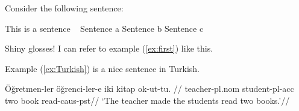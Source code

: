 \documentclass{article}
\title{}
\author{}
\date{}
\begin{document}
Consider the following sentence:

\ex This is a sentence \label{ex:first}
\xe
\pex~ %
\a \ljudge{*} Sentence a
\a \ljudge{\#} Sentence b
\a Sentence c
\xe

Shiny glosses! I can refer to example (\ref{ex:first}) like this. %


Example (\ref{ex:Turkish}) is a nice sentence in Turkish.

\ex \label{ex:Turkish}
\begingl
\gla Öğretmen-ler öğrenci-ler-e iki kitap ok-ut-tu. //
\glb teacher-{\sc pl.nom} student-{\sc pl-acc} two book read-{\sc caus-pst}//
\glft `The teacher made the students read two books.'//
\endgl
\xe
\end{document}

